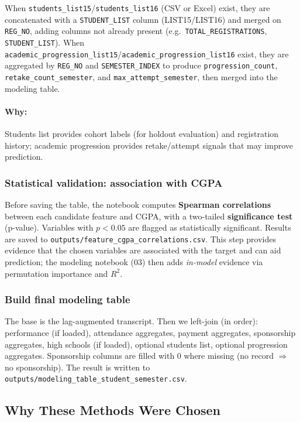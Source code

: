 \documentclass[12pt,a4paper]{article}
\begin{document}
When \texttt{students\_list15}/\texttt{students\_list16} (CSV or Excel) exist, they are concatenated with a \texttt{STUDENT\_LIST} column (LIST15/LIST16) and merged on \texttt{REG\_NO}, adding columns not already present (e.g.\ \texttt{TOTAL\_REGISTRATIONS}, \texttt{STUDENT\_LIST}). When \texttt{academic\_progression\_list15}/\texttt{academic\_progression\_list16} exist, they are aggregated by \texttt{REG\_NO} and \texttt{SEMESTER\_INDEX} to produce \texttt{progression\_count}, \texttt{retake\_count\_semester}, and \texttt{max\_attempt\_semester}, then merged into the modeling table.

\paragraph{Why:} Students list provides cohort labels (for holdout evaluation) and registration history; academic progression provides retake/attempt signals that may improve prediction.

\subsubsection{Statistical validation: association with CGPA}

Before saving the table, the notebook computes \textbf{Spearman correlations} between each candidate feature and CGPA, with a two-tailed \textbf{significance test} (p-value). Variables with \(p < 0.05\) are flagged as statistically significant. Results are saved to \texttt{outputs/feature\_cgpa\_correlations.csv}. This step provides evidence that the chosen variables are associated with the target and can aid prediction; the modeling notebook (03) then adds \emph{in-model} evidence via permutation importance and \(R^2\).

\subsubsection{Build final modeling table}

The base is the lag-augmented transcript. Then we left-join (in order): performance (if loaded), attendance aggregates, payment aggregates, sponsorship aggregates, high schools (if loaded), optional students list, optional progression aggregates. Sponsorship columns are filled with 0 where missing (no record $\Rightarrow$ no sponsorship). The result is written to \texttt{outputs/modeling\_table\_student\_semester.csv}.

\subsection{Why These Methods Were Chosen}
\end{document}

